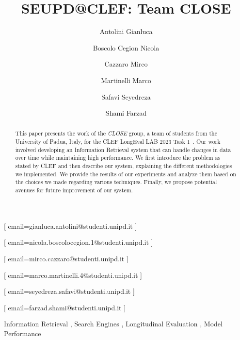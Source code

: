 \documentclass{ceurart}
\begin{document}


\title{SEUPD@CLEF: Team CLOSE}

\author[1]{Antolini Gianluca}[%
email=gianluca.antolini@studenti.unipd.it
]

\author[1]{Boscolo Cegion Nicola}[%
email=nicola.boscolocegion.1@studenti.unipd.it
]

\author[1]{Cazzaro Mirco}[%
email=mirco.cazzaro@studenti.unipd.it
]

\author[1]{Martinelli Marco}[%
email=marco.martinelli.4@studenti.unipd.it
]

\author[1]{Safavi Seyedreza}[%
email=seyedreza.safavi@studenti.unipd.it
]

\author[1]{Shami Farzad}[%
email=farzad.shami@studenti.unipd.it
]

\address[1]{University of Padua, Italy}


\begin{abstract}
  This paper presents the work of the \textit{CLOSE} group, a team of students from the University of Padua, Italy, for the \ac{CLEF} LongEval LAB 2023 Task 1~\cite{cleflongeval}.
  Our work involved developing an Information Retrieval system that can handle changes in data over time while maintaining high performance.
  We first introduce the problem as stated by \ac{CLEF} and then describe our system, explaining the different methodologies we implemented.
  We provide the results of our experiments and analyze them based on the choices we made regarding various techniques.
  Finally, we propose potential avenues for future improvement of our system.
\end{abstract}

\begin{keywords}
  Information Retrieval \sep
  Search Engines \sep
  Longitudinal Evaluation \sep
  Model Performance
\end{keywords}
\end{document}
